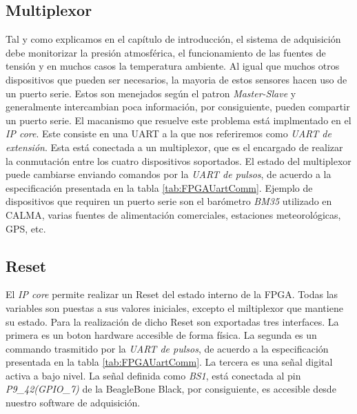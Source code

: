 	\subsection{Multiplexor}
		Tal y como explicamos en el capítulo de introducción, el sistema de adquisición debe monitorizar la presión atmosférica, el
		funcionamiento de las fuentes de tensión y en muchos casos la temperatura ambiente. Al igual que muchos otros dispositivos que pueden
		ser necesarios, la mayoria de estos sensores hacen uso de un puerto serie. Estos son menejados según el patron \emph{Master-Slave} y
		generalmente intercambian poca información, por consiguiente, pueden compartir un puerto serie. El macanismo que resuelve este
		problema está implmentado en el \emph{IP core}. Este consiste en una UART a la que nos referiremos como \emph{UART de extensión}. Esta
		está conectada a un multiplexor, que es el encargado de realizar la conmutación entre los cuatro dispositivos soportados. El estado
		del multiplexor puede cambiarse enviando comandos por la \emph{UART de pulsos}, de acuerdo a la especificación presentada en la tabla
		\ref{tab:FPGAUartComm}. Ejemplo de dispositivos que requiren un puerto serie son el barómetro \emph{BM35} utilizado en CALMA, varias
		fuentes de alimentación comerciales, estaciones meteorológicas, GPS, etc.
	\subsection{Reset}
		El \emph{IP core} permite realizar un Reset del estado interno de la FPGA. Todas las variables son puestas a sus valores iniciales,
		excepto el miltiplexor que mantiene su estado. Para la realización de dicho Reset son exportadas tres interfaces. La primera es un
		boton hardware accesible de forma física. La segunda es un commando trasmitido por la \emph{UART de pulsos}, de acuerdo a la
		especificación presentada en la tabla \ref{tab:FPGAUartComm}. La tercera es una señal digital activa a bajo nivel. La señal definida
		como \emph{BS1}, está conectada al pin \emph{P9\_42(GPIO\_7)} de la BeagleBone Black, por consiguiente, es accesible desde nuestro
		software de adquisición.
